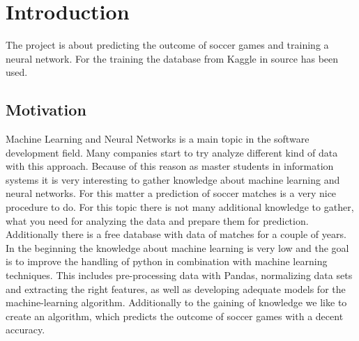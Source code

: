 
\chapter{Introduction}

The project is about predicting the outcome of soccer games and training a neural network. For the training the database from Kaggle in source \cite{kggl:2019} has been used. 


\section{Motivation}
Machine Learning and Neural Networks is a main topic in the software development field. Many companies start to try analyze different kind of data with this approach. Because of this reason as master students in information systems it is very interesting to gather knowledge about machine learning and neural networks. For this matter a prediction of soccer matches is a very nice procedure to do. For this topic there is not many additional knowledge to gather, what you need for analyzing the data and prepare them for prediction. Additionally there is a free database with data of matches for a couple of years. In the beginning the knowledge about machine learning is very low and the goal is to improve the handling of python in combination with machine learning techniques. This includes pre-processing data with Pandas, normalizing data sets and extracting the right features, as well as developing adequate models for the machine-learning algorithm. Additionally to the gaining of knowledge we like to create an algorithm, which predicts the outcome of soccer games with a decent accuracy.
